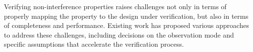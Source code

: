 Verifying non-interference properties raises challenges not only in terms of properly mapping the property to the design under verification, but also in terms of completeness and performance.
Existing work has proposed various approaches to address these challenges, including decisions on the observation mode and specific assumptions that accelerate the verification process.








